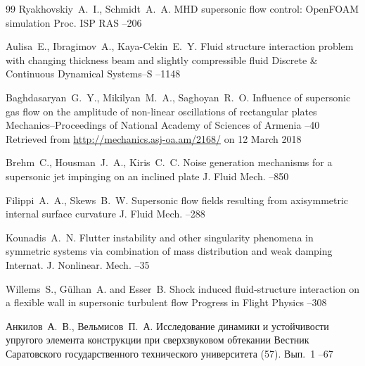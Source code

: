 \begin{thebibliography}{99}
\by Ryakhovskiy~A.~I., Schmidt~A.~A.
\paper MHD supersonic flow control: OpenFOAM simulation
\jour Proc. ISP RAS
--206
 
\by Aulisa~E., Ibragimov~A., Kaya-Cekin~E.~Y.
\paper Fluid structure interaction problem with changing thickness beam and slightly compressible fluid
\jour Discrete \& Continuous Dynamical Systems--S
--1148

\by Baghdasaryan~G.~Y., Mikilyan~M.~A., Saghoyan~R.~O.
\paper Influence of supersonic gas flow on the amplitude of non-linear oscillations of rectangular plates
\jour Mechanics--Proceedings of National Academy of Sciences of Armenia
--40
\elink Retrieved from \url{http://mechanics.asj-oa.am/2168/} on 12 March 2018
	


\by Brehm~C., Housman~J.~A., Kiris~C.~C.
\paper Noise generation mechanisms for a supersonic jet impinging on an inclined plate
\jour J. Fluid Mech.
--850

\by Filippi~A.~A., Skews~B.~W.
\paper Supersonic flow fields resulting from axisymmetric internal surface curvature
\jour J. Fluid Mech.
--288

\by Kounadis~A.~N.
\paper Flutter instability and other singularity phenomena in symmetric systems via combination of mass distribution and weak damping
\jour  Internat. J. Nonlinear. Mech.
--35

\by Willems~S., G\"ulhan~A. and Esser~B. 
\paper Shock induced fluid-structure interaction on a flexible wall in supersonic turbulent flow
\jour Progress in Flight Physics
--308

\by Анкилов~А.~В., Вельмисов~П.~А.
\paper Исследование динамики и устойчивости упругого элемента конструкции при сверхзвуковом обтекании
\jour Вестник Саратовского государственного технического университета
(57). Вып.~1
--67


\end{thebibliography}
